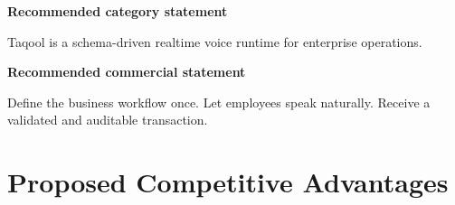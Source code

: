 \documentclass[10.5pt,a4paper]{article}
\newcommand{\BrandName}{Taqool}
\begin{document}
\begin{positionbox}
\textbf{Recommended category statement}

\medskip

\BrandName{} is a schema-driven realtime voice runtime for enterprise operations.

\medskip

\textbf{Recommended commercial statement}

\medskip

Define the business workflow once. Let employees speak naturally. Receive a validated and auditable transaction.
\end{positionbox}

\section{Proposed Competitive Advantages}
\end{document}
